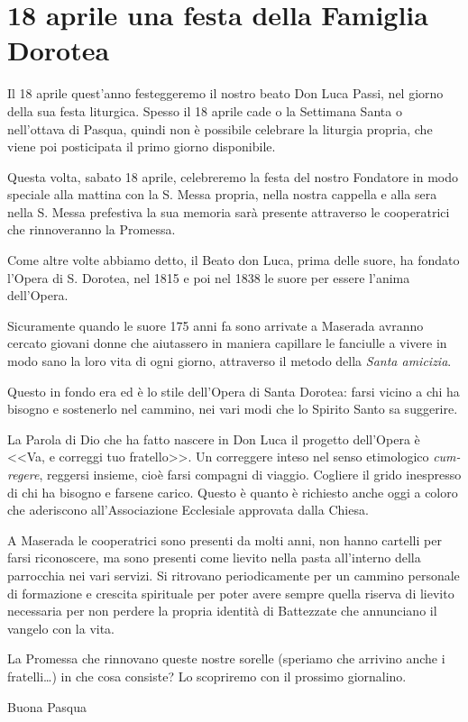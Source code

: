 \section{18 aprile una festa della Famiglia Dorotea}

Il 18 aprile quest'anno festeggeremo il nostro beato Don Luca Passi, nel giorno della sua festa liturgica. Spesso il 18 aprile cade o la Settimana Santa o nell'ottava di Pasqua, quindi non è possibile celebrare la liturgia propria, che viene poi posticipata il primo giorno disponibile.


Questa volta, sabato 18 aprile, celebreremo la festa del nostro Fondatore in modo speciale alla mattina con la S. Messa propria, nella nostra cappella e alla sera nella S. Messa prefestiva la sua memoria sarà presente attraverso le cooperatrici che rinnoveranno la Promessa.

Come altre volte abbiamo detto, il Beato don Luca, prima delle suore, ha fondato l'Opera di S. Dorotea, nel 1815 e poi nel 1838 le suore per essere l'anima dell'Opera.

Sicuramente quando le suore 175 anni fa sono arrivate a Maserada avranno cercato giovani donne che aiutassero in maniera capillare le fanciulle a vivere in modo sano la loro vita di ogni giorno, attraverso il metodo della \textit{Santa amicizia}.

Questo in fondo era ed è lo stile dell'Opera di Santa Dorotea: farsi vicino a chi ha bisogno e sostenerlo nel cammino, nei vari modi che lo Spirito Santo sa suggerire.

La Parola di Dio che ha fatto nascere in Don Luca il progetto dell'Opera è <<Va, e correggi tuo fratello>>. Un correggere inteso nel senso etimologico \textit{cum-regere}, reggersi insieme, cioè farsi compagni di viaggio. Cogliere il grido inespresso di chi ha bisogno e farsene carico. Questo è quanto è richiesto anche oggi a coloro che aderiscono all'Associazione Ecclesiale approvata dalla Chiesa.


A Maserada le cooperatrici sono presenti da molti anni, non hanno cartelli per farsi riconoscere, ma sono presenti come lievito nella pasta all'interno della parrocchia nei vari servizi. Si ritrovano periodicamente per un cammino personale di formazione e crescita spirituale per poter avere sempre quella riserva di lievito necessaria per non perdere la propria identità di Battezzate che annunciano il vangelo con la vita.

La Promessa che rinnovano queste nostre sorelle (speriamo che arrivino anche i fratelli\ldots) in che cosa consiste? Lo scopriremo con il prossimo giornalino.

Buona Pasqua

